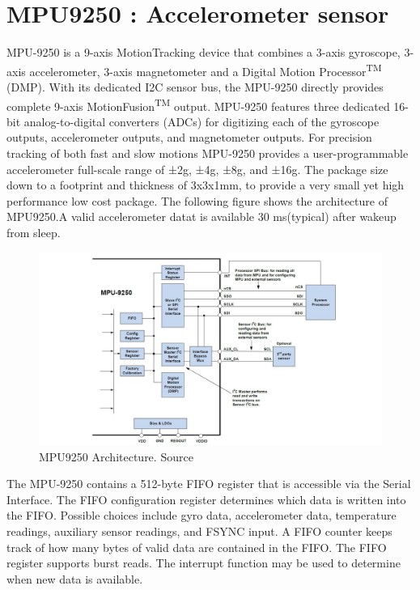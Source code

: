 \section{MPU9250 : Accelerometer sensor}\label{mpu9250_def}
MPU-9250 is a 9-axis MotionTracking device that combines a 3-axis gyroscope, 3-axis accelerometer, 3-axis magnetometer and a Digital Motion Processor\textsuperscript{TM} (DMP). With its dedicated I2C sensor bus, the MPU-9250 directly provides complete 9-axis MotionFusion\textsuperscript{TM} output. MPU-9250 features three dedicated 16-bit analog-to-digital converters (ADCs) for digitizing each of the gyroscope outputs, accelerometer outputs, and magnetometer outputs. For precision tracking of both fast and slow motions MPU-9250 provides a user-programmable accelerometer full-scale range of ±2g, ±4g, ±8g, and ±16g. The package size down to a footprint and thickness of 3x3x1mm, to provide a very small yet high performance low cost package. The following figure shows the architecture of MPU9250.A valid accelerometer datat is available 30 ms(typical) after wakeup from sleep.
\begin{figure}[h]
	\centering
	\includegraphics[scale = 0.5 ]{MPU9250.JPG}
	\caption{MPU9250 Architecture. Source \cite{mpu}\label{mpu9250}}
\end{figure}

The MPU-9250 contains a 512-byte FIFO register that is accessible via the Serial Interface. The FIFO configuration register determines which data is written into the FIFO. Possible choices include gyro data, accelerometer data, temperature readings, auxiliary sensor readings, and FSYNC input. A FIFO counter keeps track of how many bytes of valid data are contained in the FIFO. The FIFO register supports burst reads. The interrupt function may be used to determine when new data is available.

